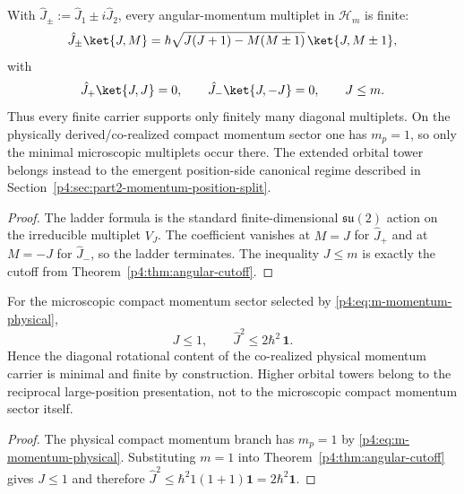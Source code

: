\documentclass[12pt,a4paper]{article}
\begin{document}
\begin{corollary}
\label{p4:cor:finite-ladders}
With \(\hat J_\pm:=\hat J_1\pm i\hat J_2\), every angular-momentum multiplet in \(\mathcal H_m\) is finite:
\begin{equation}
\label{p4:eq:Jpm-action}
\hat J_\pm\ket{J,M}
=
\hbar\sqrt{J(J+1)-M(M\pm1)}\,\ket{J,M\pm1},
\end{equation}
with
\begin{equation}
\hat J_+\ket{J,J}=0,
\qquad
\hat J_-\ket{J,-J}=0,
\qquad
J\le m.
\end{equation}
Thus every finite carrier supports only finitely many diagonal multiplets.
On the physically derived/co-realized compact momentum sector one has \(m_p=1\), so only the minimal microscopic multiplets occur there.
The extended orbital tower belongs instead to the emergent position-side canonical regime described in Section~\ref{p4:sec:part2-momentum-position-split}.
\end{corollary}

\begin{proof}
The ladder formula is the standard finite-dimensional \(\mathfrak{su}(2)\) action on the irreducible multiplet \(V_J\).  The coefficient vanishes at \(M=J\) for \(\hat J_+\) and at \(M=-J\) for \(\hat J_-\), so the ladder terminates.  The inequality \(J\le m\) is exactly the cutoff from Theorem~\ref{p4:thm:angular-cutoff}.
\end{proof}


\begin{corollary}
\label{p4:cor:physical-m1}
For the microscopic compact momentum sector selected by \eqref{p4:eq:m-momentum-physical},
\begin{equation}
\label{p4:eq:Jmax-m1}
J\le 1,
\qquad
\hat J^2\le 2\hbar^2\,\mathbf 1.
\end{equation}
Hence the diagonal rotational content of the co-realized physical momentum
carrier is minimal and finite by construction.
Higher orbital towers belong to the reciprocal large-position presentation, not to the microscopic compact momentum sector itself.
\end{corollary}

\begin{proof}
The physical compact momentum branch has \(m_p=1\) by \eqref{p4:eq:m-momentum-physical}.  Substituting \(m=1\) into Theorem~\ref{p4:thm:angular-cutoff} gives \(J\le1\) and therefore \(\hat J^2\le\hbar^2 1(1+1)\mathbf1=2\hbar^2\mathbf1\).
\end{proof}
\end{document}
